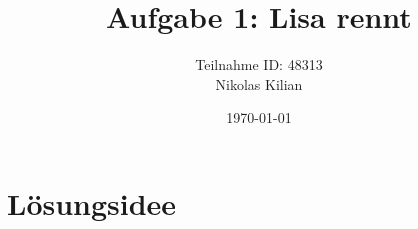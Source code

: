 \documentclass[12pt]{article}
\title{\vspace{-2.0cm}Aufgabe 1: Lisa rennt}
\author{Teilnahme ID: 48313\\Nikolas Kilian}
\date{\today}
\begin{document}
\maketitle
\tableofcontents

\section{Lösungsidee}
\end{document}
